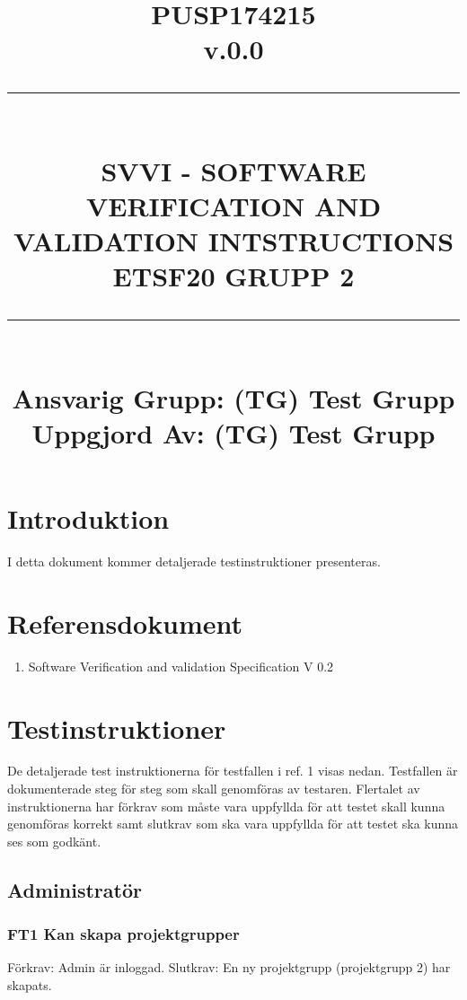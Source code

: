 \documentclass[paper=a4, fontsize=11pt,twoside]{article}
\title{
		\documentNumber{#1}																						
		\documentVersion{#2}																				
		\HRule{0.5pt} \\ %
		\LARGE \textbf{\uppercase{#3}} \\
		\large \textbf{\uppercase{ETSF20 Grupp 2}} 
		\HRule{2pt} \\ [1.5cm]    
		\normalsize            
		\documentResponsible{#4} \\ 
		\documentCreator{#4}  
	}
\newcommand{\HRule}[1]{\rule{\linewidth}{#1}}
\newcommand{\documentNumber}[1]{\centering PUSP1742#1 \\[1.0cm]}
\newcommand{\documentVersion}[1]{\centering \small{v.#1} \\[1.0cm]}
\newcommand{\documentResponsible}[1]{\centering  Ansvarig Grupp: #1}
\newcommand{\documentCreator}[1]{\centering Uppgjord Av: #1}
\newcommand{\grouptitlepage}[4]{ 
	\title{
		\documentNumber{#1}																						
		\documentVersion{#2}																				
		\HRule{0.5pt} \\ %
		\LARGE \textbf{\uppercase{#3}} \\
		\large \textbf{\uppercase{ETSF20 Grupp 2}} 
		\HRule{2pt} \\ [1.5cm]    
		\normalsize            
		\documentResponsible{#4} \\ 
		\documentCreator{#4}  
	}																							
	\maketitle																							
	\thispagestyle{empty} 																					
	\newpage 
}
\begin{document}
\grouptitlepage
{15}
{0.0}
{SVVI - Software Verification and Validation Intstructions}
{(TG) Test Grupp}
\tableofcontents
\section{Introduktion}

I detta dokument kommer detaljerade testinstruktioner presenteras.

\section{Referensdokument}

\begin{enumerate}
\item Software Verification and validation Specification V 0.2
\end{enumerate}

\section{Testinstruktioner}

De detaljerade test instruktionerna för testfallen i ref. 1 visas nedan.
Testfallen är dokumenterade steg för steg som skall genomföras av testaren. 
Flertalet av instruktionerna har förkrav som måste vara uppfyllda för att testet
skall kunna genomföras korrekt samt slutkrav som ska vara uppfyllda för att testet ska kunna ses som godkänt.

\subsection{Administratör}

\subsubsection*{FT1 Kan skapa projektgrupper}
Förkrav: Admin är inloggad.
\newline
Slutkrav:  En ny projektgrupp (projektgrupp 2) har skapats.
\end{document}
